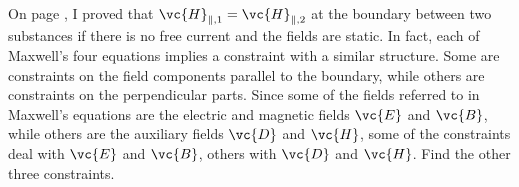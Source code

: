   On page \pageref{fig:permeability-boundary}, I proved that $\vc{H}_{\parallel,1}=\vc{H}_{\parallel,2}$
  at the boundary between two substances if there is no free current and the fields are static. In fact, each of Maxwell's
  four equations implies a constraint with a similar structure. Some are constraints on the field components parallel
  to the boundary, while others are constraints on the perpendicular parts. Since some of the fields referred to in Maxwell's
  equations are the electric and magnetic fields $\vc{E}$ and $\vc{B}$, while others are the auxiliary fields $\vc{D}$ and $\vc{H}$,
  some of the constraints deal with  $\vc{E}$ and $\vc{B}$, others with $\vc{D}$ and $\vc{H}$. Find the other three constraints.

